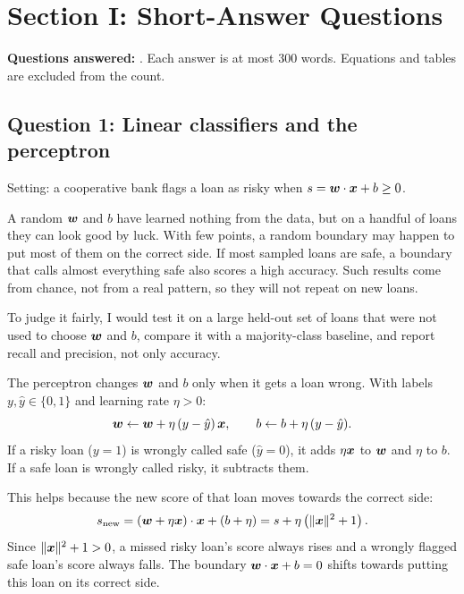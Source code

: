 \section{Section I: Short-Answer Questions}
\label{sec:one}

\noindent\textbf{Questions answered:} \SectionIChoice. Each answer is at most 300 words. Equations
and tables are excluded from the count.

\subsection{Question 1: Linear classifiers and the perceptron}
Setting: a cooperative bank flags a loan as risky when $s = \bm{w}\cdot\bm{x} + b \geq 0$.

A random $\bm{w}$ and $b$ have learned nothing from the data, but on a handful of loans they
can look good by luck. With few points, a random boundary may happen to put most of them on the
correct side. If most sampled loans are safe, a boundary that calls almost everything safe also
scores a high accuracy. Such results come from chance, not from a real pattern, so they will
not repeat on new loans.

To judge it fairly, I would test it on a large held-out set of loans that were not used to
choose $\bm{w}$ and $b$, compare it with a majority-class baseline, and report recall and
precision, not only accuracy.

The perceptron changes $\bm{w}$ and $b$ only when it gets a loan wrong. With labels
$y,\hat y \in \{0,1\}$ and learning rate $\eta>0$:
\[
  \bm{w} \leftarrow \bm{w} + \eta\,(y-\hat y)\,\bm{x}, \qquad b \leftarrow b + \eta\,(y-\hat y).
\]
If a risky loan ($y=1$) is wrongly called safe ($\hat y=0$), it adds $\eta\bm{x}$ to
$\bm{w}$ and $\eta$ to $b$. If a safe loan is wrongly called risky, it subtracts them.

This helps because the new score of that loan moves towards the correct side:
\[
  s_{\text{new}} = (\bm{w} + \eta\bm{x})\cdot\bm{x} + (b+\eta)
               = s + \eta\left(\lVert\bm{x}\rVert^2 + 1\right).
\]
Since $\lVert\bm{x}\rVert^2 + 1 > 0$, a missed risky loan's score always rises and a wrongly
flagged safe loan's score always falls. The boundary $\bm{w}\cdot\bm{x}+b=0$ shifts
towards putting this loan on its correct side.

